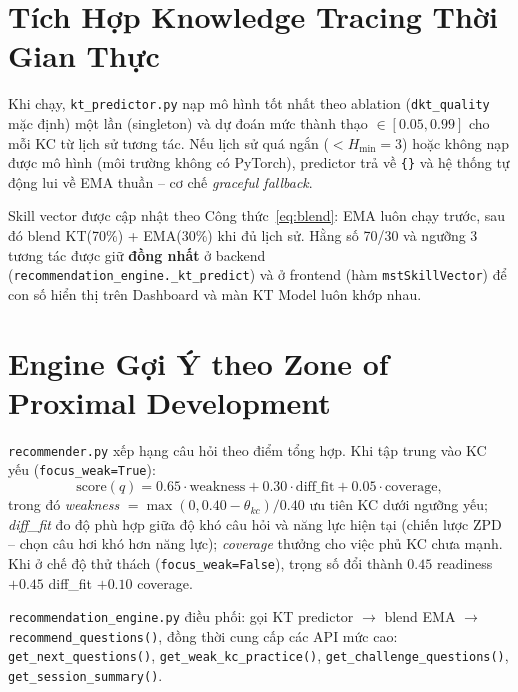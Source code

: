 \section{Tích Hợp Knowledge Tracing Thời Gian Thực}
\label{sec:kt_runtime}

Khi chạy, \texttt{kt\_predictor.py} nạp mô hình tốt nhất theo ablation (\texttt{dkt\_quality} mặc định) một lần (singleton) và dự đoán mức thành thạo $\in [0.05, 0.99]$ cho mỗi KC từ lịch sử tương tác. Nếu lịch sử quá ngắn ($< H_{\min}=3$) hoặc không nạp được mô hình (môi trường không có PyTorch), predictor trả về \texttt{\{\}} và hệ thống tự động lui về EMA thuần -- cơ chế \textit{graceful fallback}.

Skill vector được cập nhật theo Công thức~\eqref{eq:blend}: EMA luôn chạy trước, sau đó blend KT(70\%) + EMA(30\%) khi đủ lịch sử. Hằng số 70/30 và ngưỡng 3 tương tác được giữ \textbf{đồng nhất} ở backend (\texttt{recommendation\_engine.\_kt\_predict}) và ở frontend (hàm \texttt{mstSkillVector}) để con số hiển thị trên Dashboard và màn KT Model luôn khớp nhau.

\section{Engine Gợi Ý theo Zone of Proximal Development}
\label{sec:recsys_impl}

\texttt{recommender.py} xếp hạng câu hỏi theo điểm tổng hợp. Khi tập trung vào KC yếu (\texttt{focus\_weak=True}):
\begin{equation}
  \text{score}(q) = 0.65 \cdot \text{weakness} + 0.30 \cdot \text{diff\_fit} + 0.05 \cdot \text{coverage},
  \label{eq:rec_weak}
\end{equation}
trong đó \textit{weakness} $= \max(0, 0.40 - \theta_{kc})/0.40$ ưu tiên KC dưới ngưỡng yếu; \textit{diff\_fit} đo độ phù hợp giữa độ khó câu hỏi và năng lực hiện tại (chiến lược ZPD -- chọn câu hơi khó hơn năng lực); \textit{coverage} thưởng cho việc phủ KC chưa mạnh. Khi ở chế độ thử thách (\texttt{focus\_weak=False}), trọng số đổi thành $0.45$ readiness $+ 0.45$ diff\_fit $+ 0.10$ coverage.

\texttt{recommendation\_engine.py} điều phối: gọi KT predictor $\to$ blend EMA $\to$ \texttt{recommend\_questions()}, đồng thời cung cấp các API mức cao: \texttt{get\_next\_questions()}, \texttt{get\_weak\_kc\_practice()}, \texttt{get\_challenge\_questions()}, \texttt{get\_session\_summary()}.

